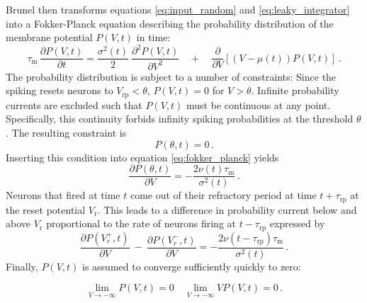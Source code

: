 Brunel then transforms equations \eqref{eq:input_random} and \eqref{eq:leaky_integrator}
into a Fokker-Planck equation describing the probability distribution of the membrane 
potential $P(V, t)$ in time: 
\begin{equation}
    \tau_\text{m} \, \frac{\partial P(V, t)}{\partial t} 
        = \frac{\sigma^2(t)}{2}  \: \frac{\partial^2 P(V, t)}{\partial V^2} 
         \quad + \quad \frac{\partial }{\partial V}  [(V- \mu(t)) P(V, t)] \, .
    \label{eq:fokker_planck}
\end{equation}
The probability distribution is subject to a number of 
constraints: Since the spiking resets neurons to $V_\text{rp} < \theta$, 
$P(V, t) = 0$ for $V > \theta$. Infinite probability currents are excluded 
such that $P(V, t)$ must be continuous at any point. Specifically, 
this continuity forbids infinity spiking probabilities at the threshold $\theta$. 
The resulting constraint is 
\begin{equation}
    P(\theta, t) = 0 \,.
    \label{eq:continuity} 
\end{equation}
Inserting this condition into equation \eqref{eq:fokker_planck} yields
\begin{equation}
    \frac{\partial P(\theta, t)}{\partial V}    
        = - \frac{2 \nu(t) \tau_\text{m}}{\sigma^2(t)}  \,.
\end{equation}
Neurons that fired at time $t$ come out of their refractory period at 
time $t + \tau_\text{rp}$ at the reset potential $V_\text{r}$. This leads to
a difference in probability current below and above $V_\text{r}$ proportional to 
the rate of neurons firing at $t - \tau_\text{rp}$ expressed by
\begin{equation}
    \frac{\partial P(V_r^+, t)}{\partial V} \: -  \: \frac{\partial P(V_r^-, t)}{\partial V} 
        = - \frac{2 \nu(t - \tau_\text{rp}) \tau_\text{m}}{\sigma^2(t)} \,.
\end{equation}
Finally, $P(V, t)$ is assumed to converge sufficiently quickly to zero:

\begin{equation}
    \lim_{V \to -\infty} P(V, t) = 0 
    \quad 
    \lim_{V \to -\infty} V P(V, t) = 0 \,.
\end{equation}

